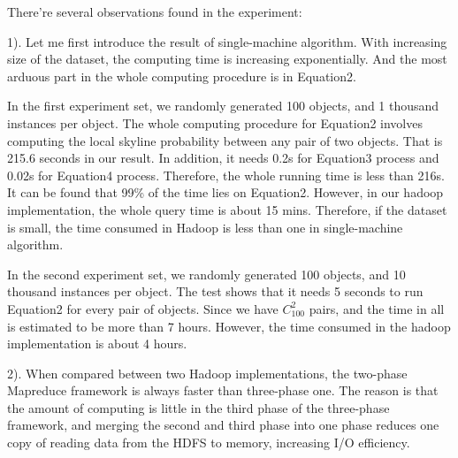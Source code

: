 There're several observations found in the experiment:


1). Let me first introduce the result of single-machine algorithm. With increasing size of the dataset, the computing time is increasing exponentially. And the most arduous part in the whole computing procedure is in Equation2.

In the first experiment set, we randomly generated 100 objects, and 1 thousand instances per object. The whole computing procedure for Equation2 involves computing the local skyline probability between any pair of two objects. That is 215.6 seconds in our result. In addition, it needs 0.2s for Equation3 process and 0.02s for Equation4 process. Therefore, the whole running time is less than 216s. It can be found that 99\% of the time lies on Equation2. However, in our hadoop implementation, the whole query time is about 15 mins. Therefore, if the dataset is small, the time consumed in Hadoop is less than one in single-machine algorithm.

In the second experiment set, we randomly generated 100 objects, and 10 thousand instances per object. The test shows that it needs 5 seconds to run Equation2 for every pair of objects. Since we have \(C_{100}^{2}\) pairs, and the time in all is estimated to be more than 7 hours. However, the time consumed in the hadoop implementation is about 4 hours.

2). When compared between two Hadoop implementations, the two-phase Mapreduce framework is always faster than three-phase one. The reason is that the amount of computing is little in the third phase of the three-phase framework, and merging the second and third phase into one phase reduces one copy of reading data from the HDFS to memory, increasing I/O efficiency.
